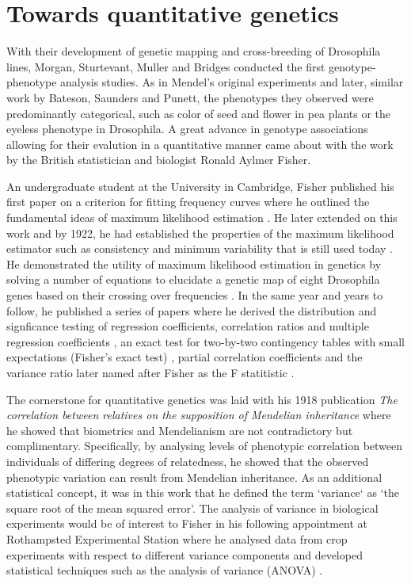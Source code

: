 \section{Towards quantitative genetics}
With their development of genetic mapping and cross-breeding of Drosophila lines, Morgan, Sturtevant, Muller and Bridges conducted the first genotype-phenotype analysis studies. As in Mendel's original experiments and later, similar work by Bateson, Saunders and Punett, the phenotypes they observed were predominantly categorical, such as color of seed and flower in pea plants or the eyeless phenotype in Drosophila. A great advance in genotype associations allowing for their evalution in a quantitative manner came about with the work by the British statistician and biologist Ronald Aylmer Fisher. 

An undergraduate student at the University in Cambridge, Fisher published his first paper on a criterion for fitting frequency curves where he outlined the fundamental ideas of maximum likelihood estimation \citep{Fisher1902}. He later extended on this work and by 1922, he had established the properties of the maximum likelihood estimator such as consistency and minimum variability \citep{Fisher1922a} that is still used today \citep{Hald1999}. He demonstrated the utility of maximum likelihood estimation in genetics by solving a number of equations to elucidate a genetic map of eight Drosophila genes based on their crossing over frequencies \citep{Fisher1922b}. In the same year and years to follow, he published a series of papers where he derived the distribution and signficance testing of regression coefficients, correlation ratios and multiple regression coefficients \citep{Fisher1922c,Fisher1928}, an exact test for two-by-two contingency tables with small expectations (Fisher's exact test) \citep{Fisher1922d}, partial correlation coefficients \citep{Fisher1924a} and the variance ratio later named after Fisher as the F statitistic \citep{Fisher1924b}. 

The cornerstone for quantitative genetics was laid with his 1918 publication \textit{The correlation between relatives on the supposition of Mendelian inheritance} where he showed that biometrics  and Mendelianism are not contradictory but complimentary. Specifically, by analysing levels of phenotypic correlation between individuals of differing degrees of relatedness, he showed that the observed phenotypic variation can result from Mendelian inheritance. As an additional statistical concept, it was in this work that he defined the term `variance` as `the square root of the mean squared error'. The analysis of variance in biological experiments would be of interest to Fisher in his following appointment at Rothampsted Experimental Station where he analysed data from crop experiments with respect to different variance components and developed statistical techniques such as the analysis of variance (ANOVA) \citep{Fisher1921,Fisher1923,Eden1929}. 

